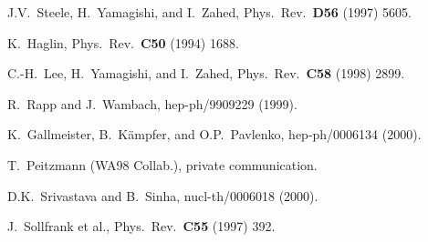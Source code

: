 \documentclass[12pt,twoside,fleqn]{article}
\begin{document}
\begin{thebibliography}{00}
 J.V.\ Steele, H.\ Yamagishi, and I.\ Zahed, Phys.\ Rev.\ {\bf D56} (1997) 5605.

 K.\ Haglin, Phys.\ Rev.\ {\bf C50} (1994) 1688.

 C.-H.\ Lee, H.\ Yamagishi, and I.\ Zahed, Phys.\ Rev.\ {\bf C58} (1998) 2899.


 R.\ Rapp and J.\ Wambach, hep-ph/9909229 (1999).

 K.\ Gallmeister, B.\ K\"ampfer, and O.P.\ Pavlenko, hep-ph/0006134 (2000).


 T.\ Peitzmann (WA98 Collab.), private communication.

 D.K.\ Srivastava and B.\ Sinha, nucl-th/0006018 (2000).


 J.\ Sollfrank et al., Phys.\ Rev.\ {\bf C55} (1997) 392.


\end{thebibliography}
\end{document}
